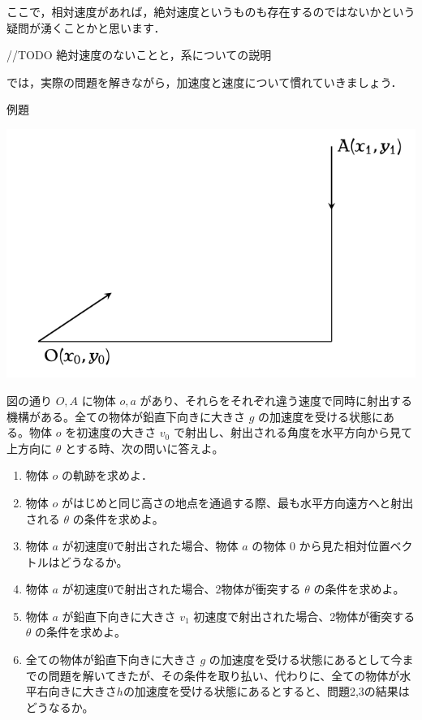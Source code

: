 \documentclass[
  b4paperpaper,
  xelatex,ja=standard]{bxjsbook}
\begin{document}
ここで，相対速度があれば，絶対速度というものも存在するのではないかという疑問が湧くことかと思います．

//TODO 絶対速度のないことと，系についての説明

では，実際の問題を解きながら，加速度と速度について慣れていきましょう．

\begin{Rbox}{例題}

\includegraphics{source/images/velocity/mondai2.png}

図の通り \(O,A\) に物体 \(o,a\)
があり、それらをそれぞれ違う速度で同時に射出する機構がある。全ての物体が鉛直下向きに大きさ
\(g\) の加速度を受ける状態にある。物体 \(o\) を初速度の大きさ \(v_0\)
で射出し、射出される角度を水平方向から見て上方向に \(\theta\)
とする時、次の問いに答えよ。

\begin{enumerate}
\def\labelenumi{\arabic{enumi}.}
\item
  物体 \(o\) の軌跡を求めよ．
\item
  物体 \(o\)
  がはじめと同じ高さの地点を通過する際、最も水平方向遠方へと射出される
  \(\theta\) の条件を求めよ。
\item
  物体 \(a\) が初速度0で射出された場合、物体 \(a\) の物体 \(0\)
  から見た相対位置ベクトルはどうなるか。
\item
  物体 \(a\) が初速度0で射出された場合、2物体が衝突する \(\theta\)
  の条件を求めよ。
\item
  物体 \(a\) が鉛直下向きに大きさ \(v_1\)
  初速度で射出された場合、2物体が衝突する \(\theta\) の条件を求めよ。
\item
  全ての物体が鉛直下向きに大きさ \(g\)
  の加速度を受ける状態にあるとして今までの問題を解いてきたが、その条件を取り払い、代わりに、全ての物体が水平右向きに大きさ\(h\)の加速度を受ける状態にあるとすると、問題2,3の結果はどうなるか。
\end{enumerate}

\end{Rbox}
\end{document}

